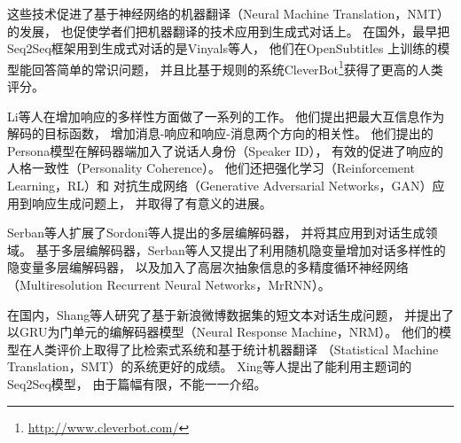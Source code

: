 这些技术促进了基于神经网络的机器翻译（Neural Machine Translation，NMT）的发展，
也促使学者们把机器翻译的技术应用到生成式对话上。
在国外，最早把Seq2Seq框架用到生成式对话的是Vinyals等人，
他们在OpenSubtitles
上训练的模型能回答简单的常识问题，
并且比基于规则的系统CleverBot\footnote{\url{http://www.cleverbot.com/}}获得了更高的人类评分。

Li等人在增加响应的多样性方面做了一系列的工作。
他们提出把最大互信息作为解码的目标函数，
增加消息-响应和响应-消息两个方向的相关性。
他们提出的Persona模型在解码器端加入了说话人身份（Speaker ID），
有效的促进了响应的人格一致性（Personality Coherence）。
他们还把强化学习（Reinforcement Learning，RL）和
对抗生成网络（Generative Adversarial Networks，GAN）应用到响应生成问题上，
并取得了有意义的进展。

Serban等人扩展了Sordoni等人提出的多层编解码器，
并将其应用到对话生成领域。
基于多层编解码器，Serban等人又提出了利用随机隐变量增加对话多样性的隐变量多层编解码器，
以及加入了高层次抽象信息的多精度循环神经网络（Multiresolution Recurrent Neural Networks，MrRNN）。

在国内，Shang等人研究了基于新浪微博数据集的短文本对话生成问题，
并提出了以GRU为门单元的编解码器模型（Neural Response Machine，NRM）。
他们的模型在人类评价上取得了比检索式系统和基于统计机器翻译
（Statistical Machine Translation，SMT）的系统更好的成绩。
Xing等人提出了能利用主题词的Seq2Seq模型，
由于篇幅有限，不能一一介绍。


